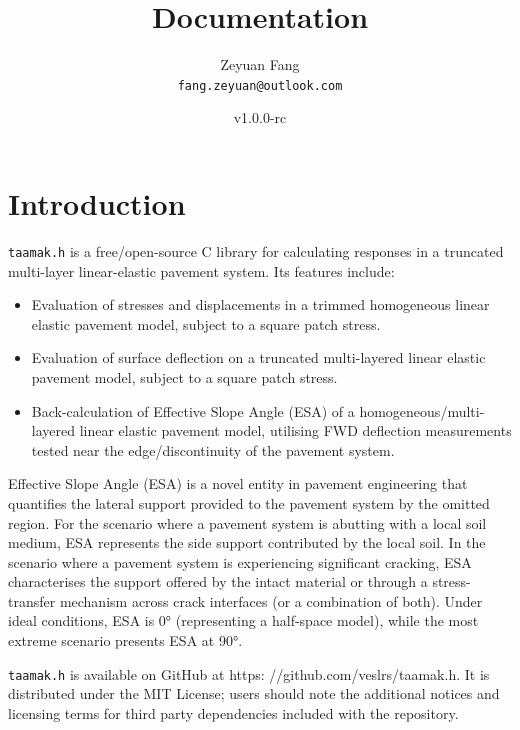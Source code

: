 \documentclass{article}
\title{\tmk{} Documentation} %
\author{Zeyuan Fang\\ \texttt{fang.zeyuan@outlook.com}} %
\date{v1.0.0-rc} %
\newcommand{\tmk}{\texttt{taamak.h}}
\begin{document}
\maketitle %
\tableofcontents

\section{Introduction}
\tmk{} is a free/open-source C library for calculating responses in a truncated multi-layer linear-elastic pavement system. Its features include:
\begin{itemize}
    \item Evaluation of stresses and displacements in a trimmed homogeneous linear elastic pavement model, subject to a square patch stress.
    \item Evaluation of surface deflection on a truncated multi-layered linear elastic pavement model, subject to a square patch stress.
    \item Back-calculation of Effective Slope Angle (ESA) of a homogeneous/multi-layered linear elastic pavement model, utilising FWD deflection measurements tested near the edge/discontinuity of the pavement system.
\end{itemize}
\begin{info} %
    Effective Slope Angle (ESA) is a novel entity in pavement engineering that quantifies the lateral support provided to the pavement system by the omitted region. For the scenario where a pavement system is abutting with a local soil medium, ESA represents the side support contributed by the local soil. In the scenario where a pavement system is experiencing significant cracking, ESA characterises the support offered by the intact material or through a stress-transfer mechanism across crack interfaces (or a combination of both). Under ideal conditions, ESA is \ang{0} (representing a half-space model), while the most extreme scenario presents ESA at \ang{90}.
\end{info}

\tmk{} is available on GitHub at https:
//github.com/veslrs/taamak.h. It is distributed under the MIT License; users should note the additional notices and licensing terms for third party dependencies included with the repository. 

\clearpage
\end{document}
